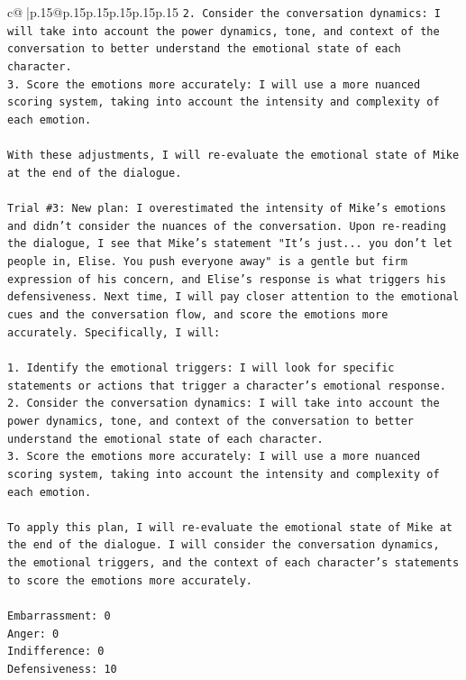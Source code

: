 \documentclass{article}
\begin{document}
{\begin{supertabular}{c@{$\;$}|p{.15\linewidth}@{}p{.15\linewidth}p{.15\linewidth}p{.15\linewidth}p{.15\linewidth}p{.15\linewidth}}
{{{\texttt{2. Consider the conversation dynamics: I will take into account the power dynamics, tone, and context of the conversation to better understand the emotional state of each character.} \\
\texttt{3. Score the emotions more accurately: I will use a more nuanced scoring system, taking into account the intensity and complexity of each emotion.} \\
\\ 
\texttt{With these adjustments, I will re{-}evaluate the emotional state of Mike at the end of the dialogue.} \\
\\ 
\texttt{Trial \#3: New plan: I overestimated the intensity of Mike's emotions and didn't consider the nuances of the conversation. Upon re{-}reading the dialogue, I see that Mike's statement "It's just... you don't let people in, Elise. You push everyone away" is a gentle but firm expression of his concern, and Elise's response is what triggers his defensiveness. Next time, I will pay closer attention to the emotional cues and the conversation flow, and score the emotions more accurately. Specifically, I will:} \\
\\ 
\texttt{1. Identify the emotional triggers: I will look for specific statements or actions that trigger a character's emotional response.} \\
\texttt{2. Consider the conversation dynamics: I will take into account the power dynamics, tone, and context of the conversation to better understand the emotional state of each character.} \\
\texttt{3. Score the emotions more accurately: I will use a more nuanced scoring system, taking into account the intensity and complexity of each emotion.} \\
\\ 
\texttt{To apply this plan, I will re{-}evaluate the emotional state of Mike at the end of the dialogue. I will consider the conversation dynamics, the emotional triggers, and the context of each character's statements to score the emotions more accurately.} \\
\\ 
\texttt{Embarrassment: 0} \\
\texttt{Anger: 0} \\
\texttt{Indifference: 0} \\
\texttt{Defensiveness: 10} \\
\\ 
\\ 
}}}
\end{supertabular}}
\end{document}
